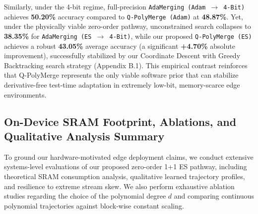 Similarly, under the 4-bit regime, full-precision \texttt{AdaMerging (Adam $\to$ 4-Bit)} achieves \textbf{50.20\%} accuracy compared to \texttt{Q-PolyMerge (Adam)} at \textbf{48.87\%}. Yet, under the physically viable zero-order pathway, unconstrained search collapses to \textbf{38.35\%} for \texttt{AdaMerging (ES $\to$ 4-Bit)}, while our proposed \texttt{Q-PolyMerge (ES)} achieves a robust \textbf{43.05\%} average accuracy (a significant \textbf{+4.70\%} absolute improvement), successfully stabilized by our Coordinate Descent with Greedy Backtracking search strategy (Appendix B.1). This empirical contrast reinforces that Q-PolyMerge represents the only viable software prior that can stabilize derivative-free test-time adaptation in extremely low-bit, memory-scarce edge environments.

\subsection{On-Device SRAM Footprint, Ablations, and Qualitative Analysis Summary}
To ground our hardware-motivated edge deployment claims, we conduct extensive systems-level evaluations of our proposed zero-order 1+1 ES pathway, including theoretical SRAM consumption analysis, qualitative learned trajectory profiles, and resilience to extreme stream skew. We also perform exhaustive ablation studies regarding the choice of the polynomial degree $d$ and comparing continuous polynomial trajectories against block-wise constant scaling. 

